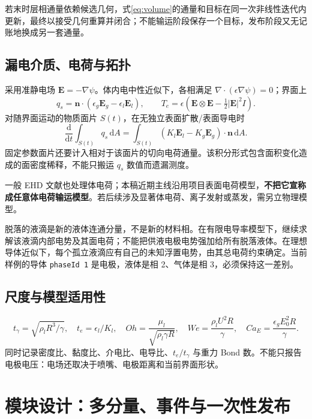 \documentclass[11pt,a4paper]{article}
\newcommand{\dd}{\mathrm{d}}
\newcommand{\vct}[1]{\boldsymbol{#1}}
\newcommand{\code}[1]{{\small\nolinkurl{#1}}}
\begin{document}
若末时层相通量依赖候选几何，式\eqref{eq:volume}的通量和目标在同一次非线性迭代内更新，最终以接受几何重算并闭合；不能输运阶段保存一个目标，发布阶段又无记账地换成另一套通量。

\subsection{漏电介质、电荷与拓扑}
采用准静电场 $\vct E=-\nabla\psi$。体内电中性近似下，各相满足 $\nabla\cdot(\epsilon\nabla\psi)=0$；界面上
\begin{equation}
q_s=\vct n\cdot(\epsilon_g\vct E_g-\epsilon_l\vct E_l),\qquad
T_e=\epsilon\left(\vct E\otimes\vct E-\tfrac12|\vct E|^2I\right).
\end{equation}
对随界面运动的物质面片 $S(t)$，在无独立表面扩散/表面导电时
\begin{equation}\label{eq:charge}
\frac{\dd}{\dd t}\int_{S(t)}q_s\,\dd A
=\int_{S(t)}(K_l\vct E_l-K_g\vct E_g)\cdot\vct n\,\dd A.
\end{equation}
固定参数面片还要计入相对于该面片的切向电荷通量。该积分形式包含面积变化造成的面密度稀释，不能只搬运 $q_s$ 数值而遗漏测度。

一般 EHD 文献也处理体电荷\cite{lopez2011}；本稿近期主线沿用项目表面电荷模型，\textbf{不把它宣称成任意体电荷输运模型}。若后续涉及显著体电荷、离子发射或蒸发，需另立物理模型。

脱落的液滴是新的液体连通分量，不是新的材料相。在有限电导率模型下，继续求解该液滴内部电势及其面电荷；不能把供液电极电势强加给所有脱落液体。在理想导体近似下，每个孤立液滴应有自己的未知浮置电势，由其总电荷约束确定。当前样例的导体 \code{phaseId 1} 是电极，液体是相 2、气体是相 3，必须保持这一差别。

\subsection{尺度与模型适用性}
\begin{equation}
t_\gamma=\sqrt{\rho_l R^3/\gamma},\quad
t_e=\epsilon_l/K_l,\quad
Oh=\frac{\mu_l}{\sqrt{\rho_l\gamma R}},\quad
We=\frac{\rho_l U^2R}{\gamma},\quad
Ca_E=\frac{\epsilon_g E_0^2R}{\gamma}.
\end{equation}
同时记录密度比、黏度比、介电比、电导比、$t_e/t_\gamma$ 与重力 Bond 数。不能只报告电极电压：电场还取决于喷嘴、电极距离和当前界面形状。

\section{模块设计：多分量、事件与一次性发布}
\end{document}
